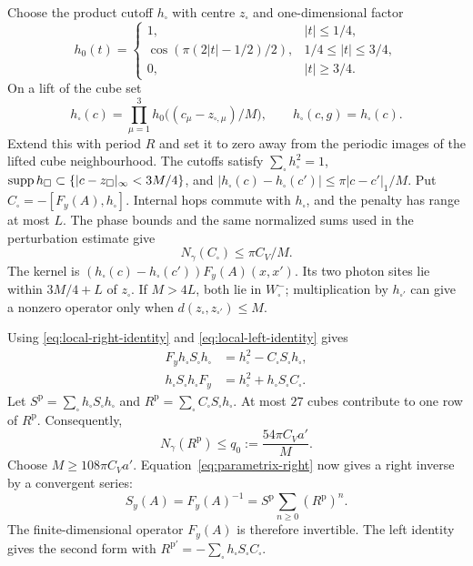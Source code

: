 Choose the product cutoff $h_\square$ with centre $z_\square$ and
one-dimensional factor
\[
 h_0(t)=\begin{cases}
 1,&|t|\le1/4,\\
 \cos(\pi(2|t|-1/2)/2),&1/4\le|t|\le3/4,\\
 0,&|t|\ge3/4.
 \end{cases}
\]
On a lift of the cube set
\[
 h_\square(c)=\prod_{\mu=1}^3
 h_0\bigl((c_\mu-z_{\square,\mu})/M\bigr),\qquad
 h_\square(c,g)=h_\square(c).
\]
Extend this with period $R$ and set it to zero away from the periodic
images of the lifted cube neighbourhood.
The cutoffs satisfy $\sum_\square h_\square^2=1$,
$\operatorname{supp} h_\square\subset\{|c-z_\square|_\infty<3M/4\}$, and
$|h_\square(c)-h_\square(c')|\le\pi|c-c'|_1/M$.
Put $C_\square=-[F_y(A),h_\square]$. Internal hops commute with
$h_\square$, and the penalty has range at most $L$. The phase bounds
and the same normalized sums used in the perturbation estimate give
\begin{equation}\label{eq:cutoff-commutator-bound}
 N_\gamma(C_\square)\le\pi C_V/M.
\end{equation}
The kernel is
$(h_\square(c)-h_\square(c'))F_y(A)(x,x')$. Its two photon sites lie
within $3M/4+L$ of $z_\square$. If $M>4L$, both lie in
$W_\square^-$; multiplication by $h_{\square'}$ can give a nonzero
operator only when $d(z_\square,z_{\square'})\le M$.

Using \eqref{eq:local-right-identity} and
\eqref{eq:local-left-identity} gives
\begin{align}
 F_yh_\square S_\square h_\square
       &=h_\square^2-C_\square S_\square h_\square,
                                   \label{eq:parametrix-right}\\
 h_\square S_\square h_\square F_y
       &=h_\square^2+h_\square S_\square C_\square.
                                   \label{eq:parametrix-left}
\end{align}
Let $S^{\mathrm p}=\sum_\square h_\square S_\square h_\square$ and
$R^{\mathrm p}=\sum_\square C_\square S_\square h_\square$.
At most $27$ cubes contribute to one row of $R^{\mathrm p}$.
Consequently,
\[
 N_\gamma(R^{\mathrm p})\le q_0:=\frac{54\pi C_Va'}M.
\]
Choose $M\ge108\pi C_Va'$. Equation~\eqref{eq:parametrix-right}
now gives a right inverse by a convergent series:
\begin{equation}\label{eq:global-parametrix-inverse}
 S_y(A)=F_y(A)^{-1}=S^{\mathrm p}\sum_{n\ge0}(R^{\mathrm p})^n.
\end{equation}
The finite-dimensional operator $F_y(A)$ is therefore invertible.
The left identity gives the second form with
$R^{\mathrm p\prime}=-\sum_\square h_\square S_\square C_\square$.

